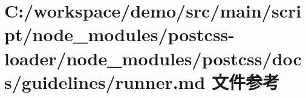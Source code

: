 \hypertarget{postcss-loader_2node__modules_2postcss_2docs_2guidelines_2runner_8md}{}\section{C\+:/workspace/demo/src/main/script/node\+\_\+modules/postcss-\/loader/node\+\_\+modules/postcss/docs/guidelines/runner.md 文件参考}
\label{postcss-loader_2node__modules_2postcss_2docs_2guidelines_2runner_8md}
